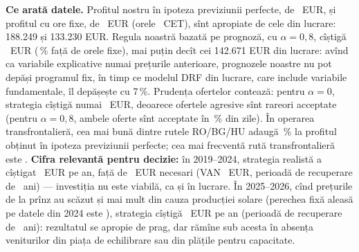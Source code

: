 %
{\textbf{Ce arată datele.} Profitul nostru în ipoteza previziunii perfecte, de \NpfCum\ EUR, și profitul cu ore fixe, de \NnhCum\ EUR (orele \NnhPair\ CET), sînt apropiate de cele din lucrare: 188.249 și 133.230 EUR.
Regula noastră bazată pe prognoză, cu $\alpha=0{,}8$, cîștigă \NqbCum\ EUR (\NqbVsNh\,\% față de orele fixe), mai puțin decît cei 142.671 EUR din lucrare: avînd ca variabile explicative numai prețurile anterioare, prognozele noastre nu pot depăși programul fix, în timp ce modelul DRF din lucrare, care include variabile fundamentale, îl depășește cu 7\,\%.
Prudența ofertelor contează: pentru $\alpha=0$, strategia cîștigă numai \NqbZero\ EUR, deoarece ofertele agresive sînt rareori acceptate (pentru $\alpha=0{,}8$, ambele oferte sînt acceptate în \NqbBoth\,\% din zile).
În operarea transfrontalieră, cea mai bună dintre rutele RO/BG/HU adaugă \NcrossGain\,\% la profitul obținut în ipoteza previziunii perfecte; cea mai frecventă rută transfrontalieră este \NtopRoute.
\textbf{Cifra relevantă pentru decizie:} în 2019--2024, strategia realistă a cîștigat \NqbYear\ EUR pe an, față de \NneedYear\ EUR necesari (VAN \NqbNPV\ EUR, perioadă de recuperare de \NqbPay\ ani) --- investiția nu este viabilă, ca și în lucrare.
În 2025--2026, cînd prețurile de la prînz au scăzut și mai mult din cauza producției solare (perechea fixă aleasă pe datele din 2024 este \NnhPairNew), strategia cîștigă \NqbYearNew\ EUR pe an (perioadă de recuperare de \NqbPayNew\ ani): rezultatul se apropie de prag, dar rămîne sub acesta în absența veniturilor din piața de echilibrare sau din plățile pentru capacitate.}

